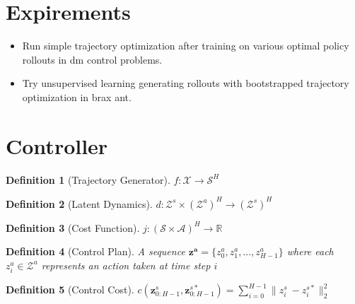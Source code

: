 \documentclass{article}
\newtheorem{definition}{Definition}
\begin{document}
\section{Expirements}

\begin{itemize}
    \item Run simple trajectory optimization after training on various optimal policy rollouts in dm control problems.
    \item Try unsupervised learning generating rollouts with bootstrapped trajectory optimization in brax ant.
\end{itemize}







\section{Controller}

\begin{definition}[Trajectory Generator]
    $f: \mathcal{X} \rightarrow \mathcal{S}^H$
\end{definition}
\begin{definition}[Latent Dynamics]
    $d: \mathcal{Z}^s \times \left(\mathcal{Z}^a\right)^H \rightarrow (\mathcal{Z}^s)^H$
\end{definition}
\begin{definition}[Cost Function]
    $j: (\mathcal{S} \times \mathcal{A})^H \rightarrow \mathbb{R}$
\end{definition}
\begin{definition}[Control Plan]
    A sequence $\mathbf{z^a} = \{z^a_0, z^a_1, ..., z^a_{H-1}\}$ where each $z^a_i \in \mathcal{Z}^a$ represents an action taken at time step $i$
\end{definition}
\begin{definition}[Control Cost]
    $c(\mathbf{z}_{0:H-1}^s, \mathbf{z}_{0:H-1}^{s*}) = \sum\limits_{i=0}^{H-1} \| z^s_i\ - z^{s*}_i \|_2^2$
\end{definition}
\end{document}
